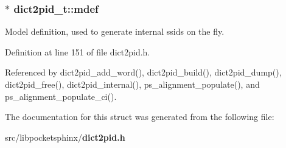 \subsubsection[{mdef}]{$\ast$ {\bf dict2pid\-\_\-t\-::mdef}}\label{structdict2pid__t_ab0dcb283a0cf5ad40836bc418fd535b3}


\-Model definition, used to generate internal ssids on the fly. 



\-Definition at line 151 of file dict2pid.\-h.



\-Referenced by dict2pid\-\_\-add\-\_\-word(), dict2pid\-\_\-build(), dict2pid\-\_\-dump(), dict2pid\-\_\-free(), dict2pid\-\_\-internal(), ps\-\_\-alignment\-\_\-populate(), and ps\-\_\-alignment\-\_\-populate\-\_\-ci().



\-The documentation for this struct was generated from the following file\-:\begin{DoxyCompactItemize}
\item 
src/libpocketsphinx/{\bf dict2pid.\-h}\end{DoxyCompactItemize}
